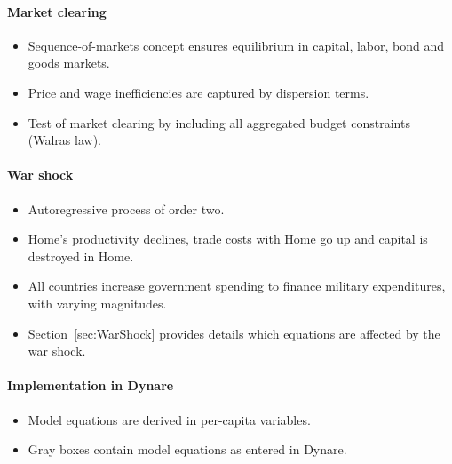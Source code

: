 \paragraph{Market clearing}
\begin{itemize}[itemsep=0pt, topsep=0pt, partopsep=0pt, parsep=0pt]
  \item Sequence-of-markets concept ensures equilibrium in capital, labor, bond and goods markets.
  \item Price and wage inefficiencies are captured by dispersion terms.
  \item Test of market clearing by including all aggregated budget constraints (Walras law).
\end{itemize}

\paragraph{War shock}
\begin{itemize}[itemsep=0pt, topsep=0pt, partopsep=0pt, parsep=0pt]
  \item Autoregressive process of order two.
  \item Home's productivity declines, trade costs with Home go up and capital is destroyed in Home.
  \item All countries increase government spending to finance military expenditures, with varying magnitudes.
  \item Section~\ref{sec:WarShock} provides details which equations are affected by the war shock.  
\end{itemize}

\newpage

\paragraph{Implementation in Dynare}
\begin{itemize}[itemsep=0pt, topsep=0pt, partopsep=0pt, parsep=0pt]
  \item Model equations are derived in per-capita variables.
  \item Gray boxes contain model equations as entered in Dynare.
\end{itemize}


